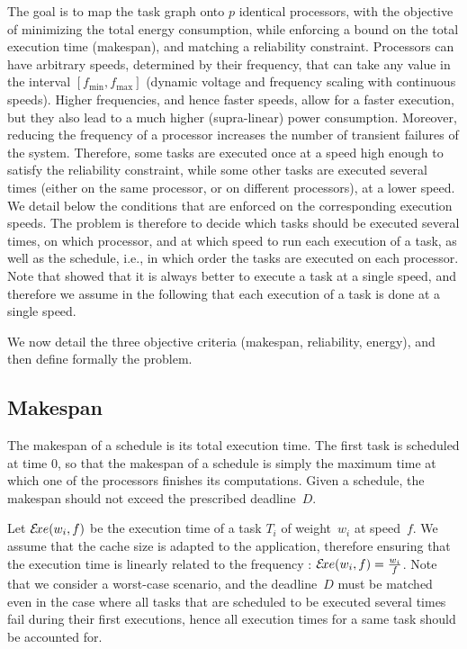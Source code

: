 \documentclass[a4paper]{article}
\theoremstyle{plain}
\theoremstyle{definition}
\theoremstyle{remark}
\newcommand{\fmax}{\ensuremath{f_{\max}}\xspace}
\newcommand{\fmin}{\ensuremath{f_{\min}}\xspace}
\begin{document}
The goal is to map the task graph onto $p$ identical processors, with
the objective of minimizing the total energy consumption, while
enforcing a bound on the total execution time (makespan), and matching
a reliability constraint. Processors can have arbitrary speeds,
determined by their frequency, that can take any value in the interval
$[\fmin,\fmax]$ (dynamic voltage and frequency scaling with continuous
speeds). Higher frequencies, and hence faster speeds, allow for a
faster execution, but they also lead to a much higher (supra-linear)
power consumption.  Moreover, reducing the frequency of a processor
increases the number of transient failures of the system. Therefore,
some tasks are executed once at a speed high enough to satisfy the
reliability constraint, while some other tasks are executed several
times (either on the same processor, or on different processors), at a
lower speed. We detail below the conditions that are enforced on the
corresponding execution speeds. The problem is therefore to decide
which tasks should be executed several times, on which processor, and
at which speed to run each execution of a task, as well as the
schedule, i.e., in which order the tasks are executed on each
processor.  Note that \cite{rr7757} showed that it is always better
to execute a task at a single speed, and therefore we assume in the
following that each execution of a task is done at a single speed.

We now detail the three objective criteria (makespan, reliability,
energy), and then define formally the problem.


\subsection{Makespan}

The makespan of a schedule is its total execution time. The first task
is scheduled at time $0$, so that the make\-span of a schedule is simply
the maximum time at which one of the processors finishes its
computations.  Given a schedule, the makespan should not exceed the
prescribed deadline~$D$. 

Let $\mathcal{E}\!xe(w_i,f)$ be the execution time of a task $T_i$ of
weight~$w_i$ at speed~$f$. We assume that the cache size is adapted to
the application, therefore ensuring that the execution time is
linearly related to the frequency \cite{Melhem03CP}: $\mathcal{E}\!xe(w_i,f) =
\frac{w_i}{f}$. Note that we consider a worst-case scenario, and the
deadline~$D$ must be matched even in the case where all tasks that are
scheduled to be executed several times fail during their first
executions, hence all execution times for a same task should be
accounted for.
\end{document}
